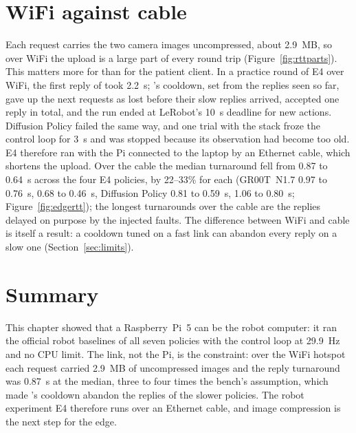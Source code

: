 \section{WiFi against cable}\label{sec:edge-cable}
Each request carries the two camera images uncompressed, about 2.9~MB, so over WiFi the upload is a large part of
every round trip (Figure~\ref{fig:rttparts}). This matters more for \drtc{} than for the patient client. In a practice
round of E4 over WiFi, the first reply of \pizerofive{} took 2.2~s; \drtc's cooldown, set from the replies seen so far,
gave up the next requests as lost before their slow replies arrived, accepted one reply in total, and the run ended at
LeRobot's 10~s deadline for new actions. Diffusion Policy failed the same way, and one \smolvla{} trial with the stack
froze the control loop for 3~s and was stopped because its observation had become too old. E4 therefore ran with the
Pi connected to the laptop by an Ethernet cable, which shortens the upload. Over the cable the median turnaround fell
from 0.87 to 0.64~s across the four E4 policies, by 22--33\% for each (GR00T~N1.7 0.97 to 0.76~s, \smolvla{} 0.68 to
0.46~s, Diffusion Policy 0.81 to 0.59~s, \pizerofive{} 1.06 to 0.80~s; Figure~\ref{fig:edgertt}); the longest
turnarounds over the cable are the replies delayed on purpose by the injected faults. The difference between WiFi and cable is itself a result: a cooldown tuned on a fast link can
abandon every reply on a slow one (Section~\ref{sec:limits}).



\section{Summary}
This chapter showed that a Raspberry~Pi~5 can be the robot computer: it ran the official robot baselines of all seven
policies with the control loop at 29.9~Hz and no CPU limit. The link, not the Pi, is the constraint: over the WiFi
hotspot each request carried 2.9~MB of uncompressed images and the reply turnaround was 0.87~s at the median, three to
four times the bench's assumption, which made \drtc's cooldown abandon the replies of the slower policies. The robot
experiment E4 therefore runs over an Ethernet cable, and image compression is the next step for the edge.
